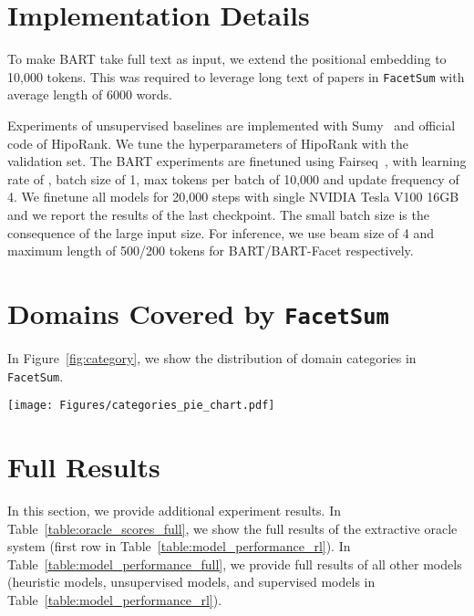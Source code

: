 \documentclass[11pt,a4paper]{article}
\newcommand{\ours}{\texttt{FacetSum}\xspace}
\newcommand{\bart}{BART\xspace}
\newcommand{\bartf}{BART-Facet\xspace}
\begin{document}
\section{Implementation Details}
\label{ref:bart_implementation}
To make BART take full text as input, we extend the positional embedding to 10,000 tokens. This was required to leverage long text of papers in \ours with average length of 6000 words. 

Experiments of unsupervised baselines are implemented with Sumy~\cite{sumy} and official code of HipoRank. We tune the hyperparameters of HipoRank with the validation set. The BART experiments are finetuned using Fairseq~\cite{ott2019fairseq}, with learning rate of , batch size of 1, max tokens per batch of 10,000 and update frequency of 4. We finetune all models for  20,000 steps with single NVIDIA Tesla V100 16GB and we report the results of the last checkpoint. The small batch size is the consequence of the large input size. For inference, we use beam size of 4 and maximum length of 500/200 tokens for \bart/\bartf respectively. 



\section{Domains Covered by \ours}
\label{appendix:domain}
In Figure~\ref{fig:category}, we show the distribution of domain categories in \ours.

\begin{figure*}[ht!]
    \centering
\texttt{[image: Figures/categories\_pie\_chart.pdf]}
    \caption{Data distribution of domain categories, sorted in descending order.}
    \label{fig:category}
\end{figure*}




\section{Full Results}
\label{appendix:full_results}
In this section, we provide additional experiment results.
In Table~\ref{table:oracle_scores_full}, we show the full results of the extractive oracle system (first row in Table~\ref{table:model_performance_rl}).
In Table~\ref{table:model_performance_full}, we provide full results of all other models (heuristic models, unsupervised models, and supervised models in Table~\ref{table:model_performance_rl}).
\end{document}
